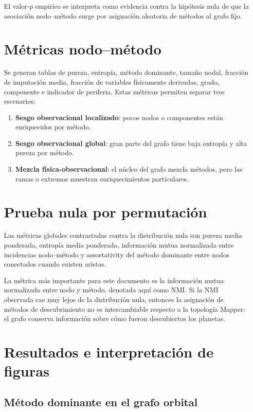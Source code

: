 \documentclass[11pt]{article}
\begin{document}
El valor-$p$ empírico se interpreta como evidencia contra la hipótesis nula de que la asociación nodo--método surge por asignación aleatoria de métodos al grafo fijo.

\section{Métricas nodo--método}

Se generan tablas de pureza, entropía, método dominante, tamaño nodal, fracción de imputación media, fracción de variables físicamente derivadas, grado, componente e indicador de periferia. Estas métricas permiten separar tres escenarios:

\begin{enumerate}
    \item \textbf{Sesgo observacional localizado}: pocos nodos o componentes están enriquecidos por método.
    \item \textbf{Sesgo observacional global}: gran parte del grafo tiene baja entropía y alta pureza por método.
    \item \textbf{Mezcla física-observacional}: el núcleo del grafo mezcla métodos, pero las ramas o extremos muestran enriquecimientos particulares.
\end{enumerate}

\section{Prueba nula por permutación}

Las métricas globales contrastadas contra la distribución nula son pureza media ponderada, entropía media ponderada, información mutua normalizada entre incidencias nodo--método y assortativity del método dominante entre nodos conectados cuando existen aristas.

La métrica más importante para este documento es la información mutua normalizada entre nodo y método, denotada aquí como NMI. Si la NMI observada cae muy lejos de la distribución nula, entonces la asignación de métodos de descubrimiento no es intercambiable respecto a la topología Mapper: el grafo conserva información sobre cómo fueron descubiertos los planetas.

\section{Resultados e interpretación de figuras}

\subsection{Método dominante en el grafo orbital}
\end{document}
